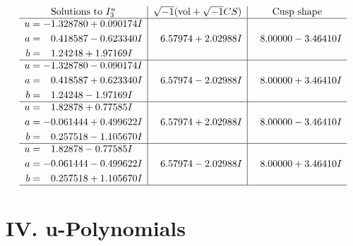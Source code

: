 \documentclass[1p]{elsarticle_modified}
\theoremstyle{definition}
\newcommand{\I}{\sqrt{-1}}
\begin{document}
$$\begin{array}{c|c|c}  
\text{Solutions to }I^u_{3}& \I (\text{vol} + \sqrt{-1}CS) & \text{Cusp shape}\\
 \hline 
\begin{aligned}
u &= -1.328780 + 0.090174 I \\
a &= \phantom{-}0.418587 - 0.623340 I \\
b &= \phantom{-}1.24248 + 1.97169 I\end{aligned}
 & \phantom{-}6.57974 + 2.02988 I & \phantom{-}8.00000 - 3.46410 I \\ \hline\begin{aligned}
u &= -1.328780 - 0.090174 I \\
a &= \phantom{-}0.418587 + 0.623340 I \\
b &= \phantom{-}1.24248 - 1.97169 I\end{aligned}
 & \phantom{-}6.57974 - 2.02988 I & \phantom{-}8.00000 + 3.46410 I \\ \hline\begin{aligned}
u &= \phantom{-}1.82878 + 0.77585 I \\
a &= -0.061444 + 0.499622 I \\
b &= \phantom{-}0.257518 - 1.105670 I\end{aligned}
 & \phantom{-}6.57974 + 2.02988 I & \phantom{-}8.00000 - 3.46410 I \\ \hline\begin{aligned}
u &= \phantom{-}1.82878 - 0.77585 I \\
a &= -0.061444 - 0.499622 I \\
b &= \phantom{-}0.257518 + 1.105670 I\end{aligned}
 & \phantom{-}6.57974 - 2.02988 I & \phantom{-}8.00000 + 3.46410 I\\
 \hline 
 \end{array}$$\newpage
\newpage\renewcommand{\arraystretch}{1}
\centering \section*{ IV. u-Polynomials}
\end{document}
